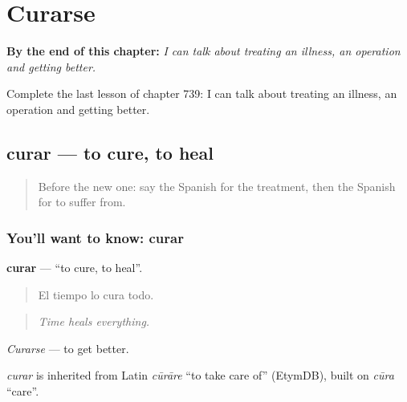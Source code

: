 
\chapter{Curarse}
\label{ch:es-curarse}

\begin{chapteropening}
\textbf{By the end of this chapter:} \emph{I can talk about treating an illness, an operation and getting better.}

Complete the last lesson of chapter 739: I can talk about treating an illness, an operation and getting better.
\end{chapteropening}

\section[curar]{curar — to cure, to heal}

\label{lesson:ES-C739-curar}



\begin{quote}
Before the new one: say the Spanish for the treatment, then the Spanish for to suffer from.
\end{quote}

\subsection*{You'll want to know: curar}
\textbf{curar} — \textquotedblleft{}to cure, to heal\textquotedblright{}.

\begin{quote}
El tiempo lo cura todo.
\end{quote}

\begin{quote}
\emph{Time heals everything.}
\end{quote}

\emph{Curarse} — to get better.

\begin{cousinweb}
\emph{curar} is inherited from Latin \emph{cūrāre} \textquotedblleft{}to take care of\textquotedblright{} (EtymDB), built on \emph{cūra} \textquotedblleft{}care\textquotedblright{}.
\end{cousinweb}

